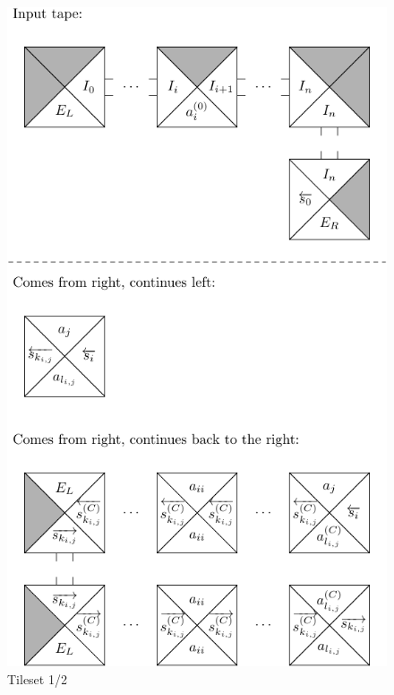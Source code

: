 		\begin{figure}[H]
		\begin{center}
			\includegraphics{./figures/tiles1.pdf}
			\caption{Tileset 1/2}
		\end{center}
		\end{figure}
		

